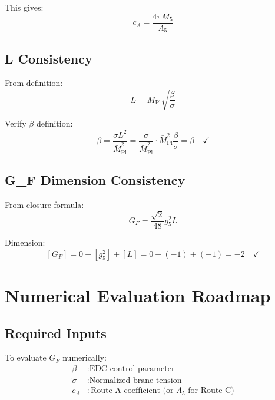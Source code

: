 \documentclass[11pt,a4paper]{article}
\begin{document}
This gives:
\begin{equation}
\label{eq:ac-ca-value}
c_A = \frac{4\pi M_5}{\Lambda_5}
\end{equation}

\subsection{L Consistency}
\label{app:L-consistency}

From definition:
\begin{equation}
\label{eq:L-def-check}
L = \bar{M}_{\text{Pl}} \sqrt{\frac{\beta}{\sigma}}
\end{equation}

Verify $\beta$ definition:
\begin{equation}
\label{eq:beta-verify}
\beta = \frac{\sigma L^2}{\bar{M}_{\text{Pl}}^2} = \frac{\sigma}{\bar{M}_{\text{Pl}}^2} \cdot \bar{M}_{\text{Pl}}^2 \frac{\beta}{\sigma} = \beta \quad \checkmark
\end{equation}

\subsection{G_F Dimension Consistency}
\label{app:gf-dim-consistency}

From closure formula:
\begin{equation}
\label{eq:gf-closure-check}
G_F = \frac{\sqrt{2}}{48} g_5^2 L
\end{equation}

Dimension:
\begin{equation}
\label{eq:gf-dim-full}
[G_F] = 0 + [g_5^2] + [L] = 0 + (-1) + (-1) = -2 \quad \checkmark
\end{equation}

\section{Numerical Evaluation Roadmap}
\label{app:numeric-roadmap}

\subsection{Required Inputs}
\label{app:required-inputs}

To evaluate $G_F$ numerically:
\begin{align}
\label{eq:input-beta}
\beta &: \text{EDC control parameter} \\
\label{eq:input-sigma}
\tilde{\sigma} &: \text{Normalized brane tension} \\
\label{eq:input-ca}
c_A &: \text{Route A coefficient (or } \Lambda_5 \text{ for Route C)}
\end{align}
\end{document}
